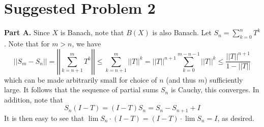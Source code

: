 \documentclass[aps,pra,showpacs,notitlepage,onecolumn,superscriptaddress,nofootinbib]{revtex4-1}
\theoremstyle{definition}
\newtheorem{theorem}{Theorem}[section]
\begin{document}
\begin{comment}
\noindent \emph{As one of my problems, I would like to independently prove a theorem of Pedersen (I haven't read the proof), which I used above.}

\begin{theorem}
  Every finite-dimensional subspace $D$ of normed space $X$ is a Banach space (thus closed). Moreover, if $\dim(D) = n$, then every linear isomorphism of $\mathbb{F}^n$
  to $D$ is a homeomorphism.
\end{theorem}
\begin{proof}
  Let $e_1, \dots, e_n$ be a normalized basis for $D$. Let $\Phi : \mathbb{F}^n \rightarrow D$ be the map defined as
  \begin{equation}
    \Phi(c_1, \dots, c_n) = \sum_{j = 1}^{n} c_j e_j
  \end{equation}
  which is clearly continuous, as we know arithmetic is continuous. In fact, we know that $\Phi$ is a linear isomorphism of spaces.
  We must show that $\Phi^{-1}$ is continuous. Let $V$ be an open ball centred at $0 \in D$ of radius $R$. Note that
  $R e_j = \Phi(0, \dots, R, \dots, 0)$ is in $\Phi(V)$ for each $j$. Moreover, the convex hull of the points $Re_1, \dots, Re_n$
  is in $\Phi(V)$, as
  \begin{equation}
    \left|\left| \sum_{j = 1}^{n} \alpha_j (R e_j) \right|\right| \leq R \sum_{j = 1}^{n} \alpha_j = R
  \end{equation}
  for $\alpha_1 + \cdots + \alpha_n = 1$.
\end{proof}
\end{comment}

\section{Suggested Problem 2}

\noindent \textbf{Part A.} Since $X$ is Banach, note that $B(X)$ is also Banach. Let $S_n = \sum_{k=0}^{n} T^k$. Note that for $m > n$, we have
\begin{equation}
||S_m - S_n|| = \left|\left| \sum_{k = n + 1}^{m} T^{k} \right|\right| \leq \sum_{k = n + 1}^{m} ||T||^k = ||T||^{n + 1} \sum_{k = 0}^{m - n - 1} ||T||^{k} \leq \frac{||T||^{n + 1}}{1 - ||T||}
\end{equation}
which can be made arbitrarily small for choice of $n$ (and thus $m$) sufficiently large. It follows that the sequence of partial sums $S_n$ is Cauchy, this converges. In addition, note that
\begin{equation}
  S_n (I - T) = (I - T) S_n = S_n - S_{n + 1} + I
\end{equation}
It is then easy to see that $\lim S_n \cdot (I - T) = (I - T) \cdot \lim S_n = I$, as desired.
\newline
\end{document}
